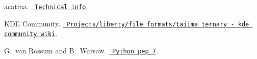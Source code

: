 
\begin{DoxyDescription}
\item[\label{citelist_CITEREF_acatina}%
\Hypertarget{citelist_CITEREF_acatina}%
\mbox{[}1\mbox{]}]acatina. \href{http://www.achatina.de/sewing/main/TECHNICL.HTM}{\texttt{ Technical info}}.


\item[\label{citelist_CITEREF_kde_tajima}%
\Hypertarget{citelist_CITEREF_kde_tajima}%
\mbox{[}2\mbox{]}]KDE Community. \href{https://community.kde.org/Projects/Liberty/File_Formats/Tajima_Ternary}{\texttt{ Projects/liberty/file formats/tajima ternary -\/ kde community wiki}}.


\item[\label{citelist_CITEREF_pep7}%
\Hypertarget{citelist_CITEREF_pep7}%
\mbox{[}3\mbox{]}]G.~van Rossum and B.~Warsaw. \href{https://peps.python.org/pep-0007/}{\texttt{ Python pep 7}}.


\end{DoxyDescription}